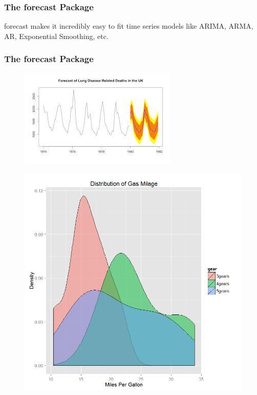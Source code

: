 \documentclass{beamer}
\begin{document}
\begin{frame}
\frametitle{The forecast Package}	
	
forecast makes it incredibly easy to fit time series models like ARIMA, ARMA, AR, Exponential Smoothing, etc.

	
	
\end{frame}


\begin{frame}
	\frametitle{The forecast Package}	
	
	\begin{figure}
\centering
\includegraphics[width=0.7\linewidth]{forecast}

\end{figure}

	
	
\end{frame}
\begin{frame}
	
	
	
	
	\begin{figure}
\centering
\includegraphics[width=0.9\linewidth]{ggplotdensity}
\caption{}
\label{fig:ggplotdensity}
\end{figure}

\end{frame}
\end{document}
